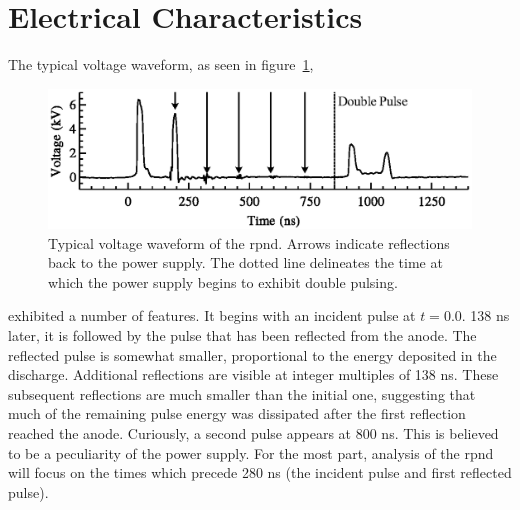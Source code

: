 \section{Electrical Characteristics}

The typical voltage waveform, as seen in figure~\ref{fig:waveform},
\begin{figure}
  \centering
  \includegraphics{./chapters/experiment/figures/waveform.eps}
  \caption{Typical voltage waveform of the \acs{rpnd}. Arrows indicate
    reflections back to the power supply. The dotted line delineates the time at
    which the power supply begins to exhibit double pulsing.}
  \label{fig:waveform}
\end{figure}
exhibited a number of features. It begins with an incident pulse at $t = 0.0$.
138 ns later, it is followed by the pulse that has been reflected from the
anode. The reflected pulse is somewhat smaller, proportional to the energy
deposited in the discharge. Additional reflections are visible at integer
multiples of 138 ns. These subsequent reflections are much smaller than the
initial one, suggesting that much of the remaining pulse energy was dissipated
after the first reflection reached the anode. Curiously, a second pulse appears
at 800 ns. This is believed to be a peculiarity of the power supply. For the
most part, analysis of the \acs{rpnd} will focus on the times which precede 280
ns (the incident pulse and first reflected pulse).

